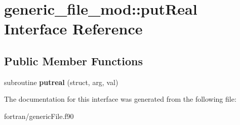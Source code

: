 \hypertarget{interfacegeneric__file__mod_1_1put_real}{}\section{generic\+\_\+file\+\_\+mod\+:\+:put\+Real Interface Reference}
\label{interfacegeneric__file__mod_1_1put_real}
\subsection*{Public Member Functions}
\begin{DoxyCompactItemize}
\item 
\mbox{\label{interfacegeneric__file__mod_1_1put_real_a4ed5de3089520cd7cd295b30a05fb5a3}} 
subroutine {\bfseries putreal} (struct, arg, val)
\end{DoxyCompactItemize}


The documentation for this interface was generated from the following file\+:\begin{DoxyCompactItemize}
\item 
fortran/generic\+File.\+f90\end{DoxyCompactItemize}
